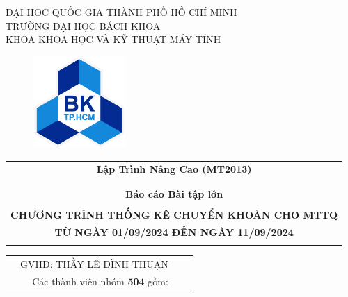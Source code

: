 \documentclass{article}
\begin{document}
\lstset{style=myStyle}
\begin{titlepage}
\begin{center}
    \large ĐẠI HỌC QUỐC GIA THÀNH PHỐ HỒ CHÍ MINH \\
    TRƯỜNG ĐẠI HỌC BÁCH KHOA \\
    KHOA KHOA HỌC VÀ KỸ THUẬT MÁY TÍNH
\end{center}

\vspace{1.5cm}

\begin{figure}[!ht]
    \centering \includegraphics[width=3.5cm]{Images/bachkhoa_logo.png}
\end{figure}

\vspace{1.5cm}

\begin{table}[H]
    \centering
    \begin{tabular}{c}
    {\bf \Large Lập Trình Nâng Cao (MT2013)} \\ \\
    \hline  \\
    \multicolumn{c}{c}{{\bf \huge Báo cáo Bài tập lớn}}    \\  \\
    {\bf CHƯƠNG TRÌNH THỐNG KÊ CHUYỂN KHOẢN CHO MTTQ}     \\  
    {\bf  TỪ NGÀY 01/09/2024 ĐẾN NGÀY 11/09/2024}     \\  \\
    \hline
    \end{tabular}
\end{table}

\vspace{1.5cm}

\begin{table}[h]
\centering
\begin{tabular}{lrlc}

\hspace{0 cm} & GVHD: THẦY LÊ ĐÌNH THUẬN  & \vspace{0.5cm}\\
& Các thành viên nhóm \textbf{504} gồm: &  
 	

\end{tabular}
\end{table}
\end{titlepage}
\end{document}
